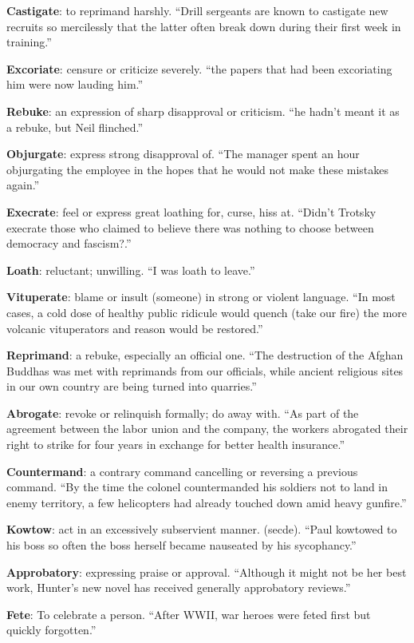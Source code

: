 \documentclass[12pt, a4paper]{ximera}
\begin{document}
\textbf{Castigate}: to reprimand harshly. ``Drill sergeants are known to castigate new recruits so mercilessly that the latter often break down during their first week in training.''

\textbf{Excoriate}: censure or criticize severely. ``the papers that had been excoriating him were now lauding him.''

\textbf{Rebuke}: an expression of sharp disapproval or criticism. ``he hadn't meant it as a rebuke, but Neil flinched.''

\textbf{Objurgate}: express strong disapproval of. ``The manager spent an hour objurgating the employee in the hopes that he would not make these mistakes again.''

\textbf{Execrate}: feel or express great loathing for, curse, hiss at. ``Didn't Trotsky execrate those who claimed to believe there was nothing to choose between democracy and fascism?.''

\textbf{Loath}: reluctant; unwilling. ``I was loath to leave.''

\textbf{Vituperate}: blame or insult (someone) in strong or violent language. ``In most cases, a cold dose of healthy public ridicule would quench (take our fire) the more volcanic vituperators and reason would be restored.''

\textbf{Reprimand}: a rebuke, especially an official one. ``The destruction of the Afghan Buddhas was met with reprimands from our officials, while ancient religious sites in our own country are being turned into quarries.''

\textbf{Abrogate}: revoke or relinquish formally; do away with. ``As part of the agreement between the labor union and the company, the workers abrogated their right to strike for four years in exchange for better health insurance.''

\textbf{Countermand}: a contrary command cancelling or reversing a previous command. ``By the time the colonel countermanded his soldiers not to land in enemy territory, a few helicopters had already touched down amid heavy gunfire.''

\textbf{Kowtow}: act in an excessively subservient manner. (secde). ``Paul kowtowed to his boss so often the boss herself became nauseated by his sycophancy.''

\textbf{Approbatory}: expressing praise or approval. ``Although it might not be her best work, Hunter's new novel has received generally approbatory reviews.''

\textbf{Fete}: To celebrate a person. ``After WWII, war heroes were feted first but quickly forgotten.''
\end{document}
